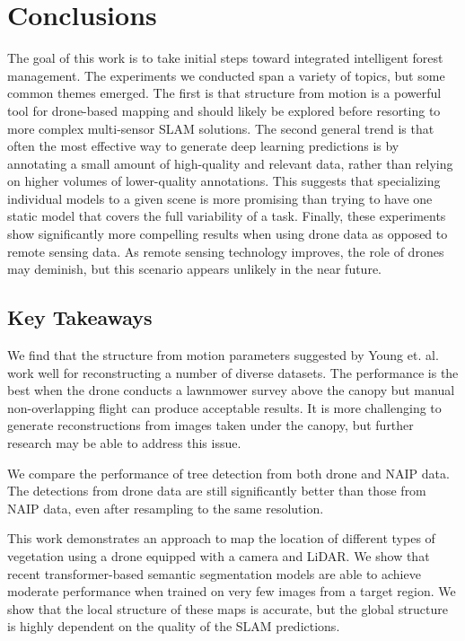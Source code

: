 
\chapter{Conclusions} \label{chapConclusions}
The goal of this work is to take initial steps toward integrated intelligent forest management. The experiments we conducted span a variety of topics, but some common themes emerged. The first is that structure from motion is a powerful tool for drone-based mapping and should likely be explored before resorting to more complex multi-sensor SLAM solutions. The second general trend is that often the most effective way to generate deep learning predictions is by annotating a small amount of high-quality and relevant data, rather than relying on higher volumes of lower-quality annotations. This suggests that specializing individual models to a given scene is more promising than trying to have one static model that covers the full variability of a task. Finally, these experiments show significantly more compelling results when using drone data as opposed to remote sensing data. As remote sensing technology improves, the role of drones may deminish, but this scenario appears unlikely in the near future.  

\section{Key Takeaways}
We find that the structure from motion parameters suggested by Young et. al. \cite{Young2022} work well for reconstructing a number of diverse datasets. The performance is the best when the drone conducts a lawnmower survey above the canopy but manual non-overlapping flight can produce acceptable results. It is more challenging to generate reconstructions from images taken under the canopy, but further research may be able to address this issue.

We compare the performance of tree detection from both drone and NAIP data. The detections from drone data are still significantly better than those from NAIP data, even after resampling to the same resolution.

This work demonstrates an approach to map the location of different types of vegetation using a drone equipped with a camera and LiDAR. We show that recent transformer-based semantic segmentation models are able to achieve moderate performance when trained on very few images from a target region. We show that the local structure of these maps is accurate, but the global structure is highly dependent on the quality of the SLAM predictions.

